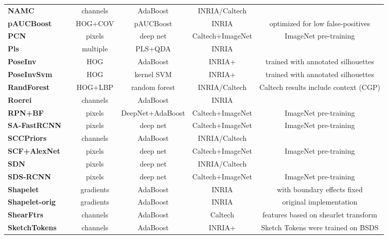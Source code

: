 \documentclass[onecolumn]{article}
\begin{document}
\begin{table}[!h]
\begin{tabular}{@{}l@{\cp}c|c@{\cp}c@{\cp}c|c@{}}
  \textbf{NAMC} & \cite{TocaBMVC15} & channels & AdaBoost & INRIA/Caltech & \\
  \textbf{pAUCBoost} & \cite{PaisitkriangkraiICCV13} & HOG+COV & pAUCBoost & INRIA &
   optimized for low false-positives \\
  \textbf{PCN} & \cite{WangBMVC17} & pixels & deep net & Caltech+ImageNet & ImageNet pre-training \\
  \textbf{Pls} & \cite{SchwartzICCV09} & multiple & PLS+QDA & INRIA & \\
  \textbf{PoseInv} & \cite{LinECCV08} & HOG & AdaBoost & INRIA+ &
   trained with annotated silhouettes\\
  \textbf{PoseInvSvm} & \cite{LinECCV08} & HOG & kernel SVM & INRIA+ &
   trained with annotated silhouettes\\
  \textbf{RandForest} & \cite{MarinICCV13} & HOG+LBP & random forest & INRIA/Caltech &
    Caltech results include context (CGP)\\
  \textbf{Roerei} & \cite{BenensonCVPR13} & channels & AdaBoost & INRIA & \\
  \textbf{RPN+BF} & \cite{ZhangECCV16} & pixels & DeepNet+AdaBoost & Caltech+ImageNet & ImageNet pre-training \\
  \textbf{SA-FastRCNN} & \cite{LiArxiv2016} & pixels & deep net & Caltech+ImageNet & ImageNet pre-training \\
  \textbf{SCCPriors} & \cite{YangBMVC15} & channels & AdaBoost & INRIA/Caltech & \\
  \textbf{SCF+AlexNet} & \cite{HosangCVPR15} & pixels & deep net & Caltech+ImageNet & ImageNet pre-training \\  
  \textbf{SDN} & \cite{LuoCVPR14} & pixels & deep net & INRIA/Caltech & \\
  \textbf{SDS-RCNN} & \cite{BrazilICCV17} & pixels & deep net & Caltech+ImageNet & ImageNet pre-training \\
  \textbf{Shapelet} & \cite{SabzmeydaniCVPR07} & gradients & AdaBoost & INRIA &
   with boundary effects fixed \cite{WojekDAGM08}\\
  \textbf{Shapelet-orig} & \cite{SabzmeydaniCVPR07} & gradients & AdaBoost & INRIA &
   original implementation\\
  \textbf{ShearFtrs} & \cite{PfeiferJMIV19} & channels & AdaBoost & Caltech &
   features based on shearlet transform \\
  \textbf{SketchTokens} & \cite{LimCVPR13} & channels & AdaBoost & INRIA+ &
   Sketch Tokens were trained on BSDS\\

\end{tabular}
\end{table}
\end{document}
